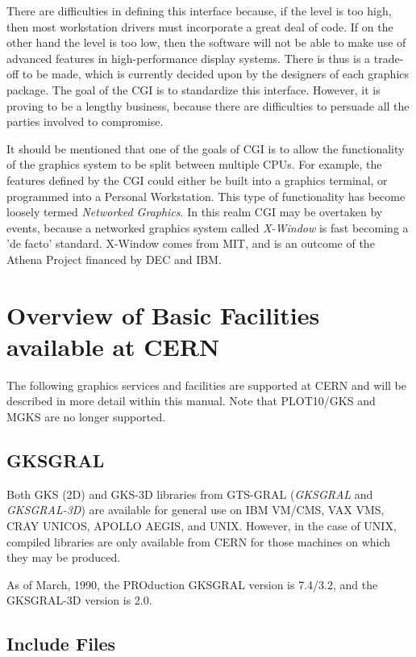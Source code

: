 There are difficulties in defining this interface because, if the
level is too high, then most workstation drivers must incorporate
a great deal of code. If on the other hand the level is too low,
then the software will not be able to make use of advanced features
in high-performance display systems.
There is thus is a trade-off to be made, which is currently
decided upon by the designers of each graphics package.
The goal of the CGI \cite{bib-cgiref} is to standardize this interface.
However, it is proving to be a lengthy business,
because there are difficulties to persuade all the
parties involved to compromise.
 
It should be mentioned that one of the goals of CGI is to allow
the functionality of the graphics system to be split between multiple
CPUs. For example, the features defined by the CGI could either be
built into a graphics terminal, or programmed into a Personal Workstation.
This type of functionality has become loosely termed
{\it Networked Graphics}.
In this realm CGI may be overtaken by events, because a networked graphics
system called {\it X-Window} is fast becoming a 'de facto' standard.
X-Window comes from MIT, and is an outcome of the Athena Project
financed by DEC and IBM.
\section{Overview of Basic Facilities available at CERN}
 
The following graphics services and facilities are supported at CERN
and will be described in more detail within this manual.
Note that PLOT10/GKS and MGKS are no longer supported.
\subsection{GKSGRAL}
 
Both GKS (2D) and GKS-3D libraries from GTS-GRAL ({\it GKSGRAL} and
{\it GKSGRAL-3D}) are available for general use
on IBM VM/CMS, VAX VMS, CRAY UNICOS, APOLLO AEGIS, and UNIX.
However, in the case of UNIX, compiled libraries are only available from CERN
for those machines on which they may be produced.
 
As of March, 1990, the PROduction GKSGRAL version
is 7.4/3.2, and the GKSGRAL-3D version is 2.0.
\subsection{Include Files}
 
